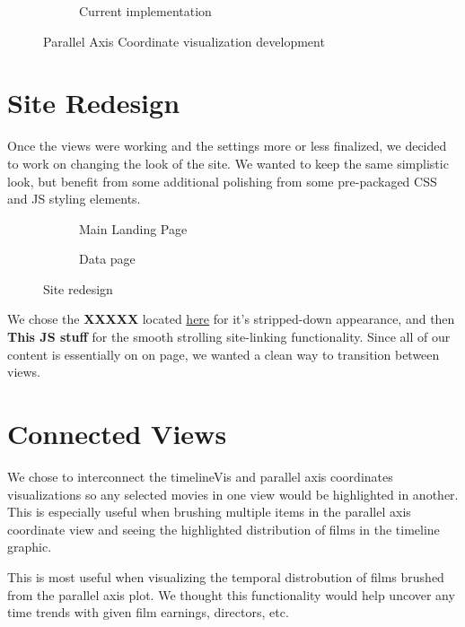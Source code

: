 \documentclass[12pt]{article}
\begin{document}
\begin{figure}[h!]
\begin{subfigure}[t]{.8\textwidth}
			  \caption{Current implementation}
			  \label{fig:sub2}
		\end{subfigure}%
		\caption{Parallel Axis Coordinate visualization development}
		\label{fig:parallelAxisCoordVis}
	\end{figure}



\section{Site Redesign}

Once the views were working and the settings more or less finalized, we decided to work on changing the look of the site.  We wanted to keep the same simplistic look, but benefit from some additional polishing from some pre-packaged CSS and JS styling elements.   

	\begin{figure}[h!]
		\centering
		\begin{subfigure}[t]{.5\textwidth}
			  \centering
			  \caption{Main Landing Page}
			  \label{fig:redesignA}
		\end{subfigure}%
		\begin{subfigure}[t]{.8\textwidth}
			  \centering
			  \caption{Data page}
			  \label{fig:redesignB}
		\end{subfigure}%
		\caption{Site redesign}
		\label{fig:SiteRedesign}
	\end{figure}
We chose the \textbf{XXXXX} located \href{www.google.com}{here} for it's stripped-down appearance, and then \textbf{This JS stuff} for the smooth strolling site-linking functionality.  Since all of our content is essentially on on page, we wanted a clean way to transition between views.

\section{Connected Views}

We chose to interconnect the timelineVis and parallel axis coordinates visualizations so any selected movies in one view would be highlighted in another.  This is especially useful when brushing multiple items in the parallel axis coordinate view and seeing the highlighted distribution of films in the timeline graphic.

This is most useful when visualizing the temporal distrobution of films brushed from the parallel axis plot.  We thought this functionality would help uncover any time trends with given film earnings, directors, etc.
\end{document}

